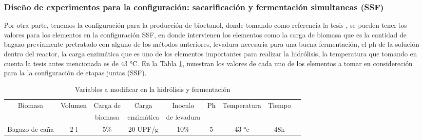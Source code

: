 \documentclass[12pt]{article}
\begin{document}
\newpage
	
		\subsubsection{Diseño de experimentos para la configuración:
			sacarificación y fermentación simultaneas (SSF)}
		\label{SacariSF}	
		
		
		Por otra parte, tenemos la configuración para la producción de bioetanol, donde tomando como referencia la tesis \cite{Arturo2022evaluacion}, se pueden tener los valores para los elementos en la configuración SSF, en donde intervienen los elementos como la carga de biomasa que es la cantidad de bagazo previamente pretratado con alguno de los métodos anteriores, levadura necesaria para una buena fermentación, el ph de la solución dentro del reactor, la carga enzimática que es uno de los elementos importantes para realizar la hidrólisis, la temperatura que tomando en cuenta la tesis antes mencionada es de 43 °C. En la Tabla 	\ref{tab:Variables a modificar para la hidrolisis y fermentacion}, muestran los valores de cada uno de los elementos a tomar en considereción para la la configuración de etapas juntas (SSF). \\[0.5em]
		
		\begin{table} [h!]
			\centering
			\caption{Variables a modificar en la hidrólisis y fermentación}
			\label{tab:Variables a modificar para la hidrolisis y fermentacion}
			\small
			\resizebox{17cm}{!} {
			\begin{tabular}{|c|c|c|c|c|c|c|c|c|}
				\hline
				Biomasa  & Volumen  & Carga de  & Carga  & Inoculo  & Ph  & Temperatura  & Tiempo   \\
				 &   &  biomasa  & enzimática  & de levadura  & &  &     \\
				
				\hline
			\multirow{2}{*}{Bagazo de caña} &\multirow{2}{*}{2 l}  &\multirow{2}{*}{5\%}  & \multirow{2}{*}{20 UPF/g } & \multirow{2}{*}{10\% } &\multirow{2}{*}{ 5} & \multirow{2}{*}{43 °c} & \multirow{2}{*}{48h }   \\
			  &   & & &  &  & &     \\		
				\hline
			\end{tabular}}
		\end{table}
		
		
		
		
		
		
\end{document}
